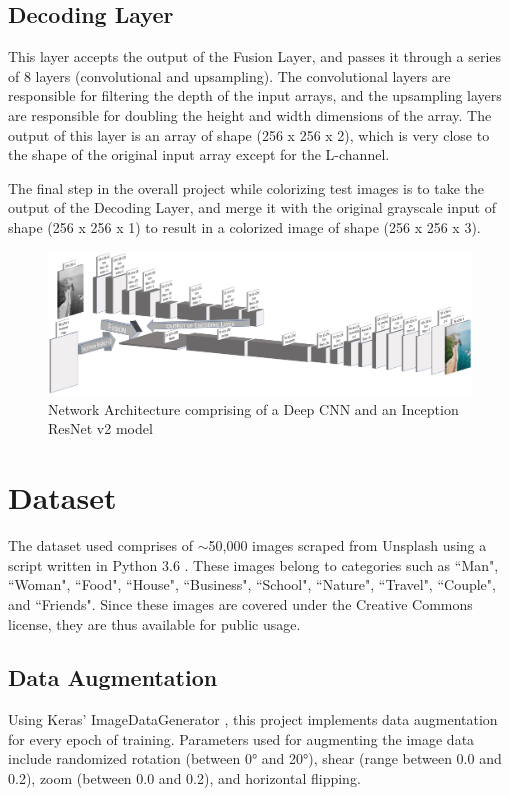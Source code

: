 \documentclass[10pt,twocolumn,letterpaper]{article}
\begin{document}
	\subsection{Decoding Layer}
	This layer accepts the output of the Fusion Layer, and passes it through a series of 8 layers (convolutional and upsampling). The convolutional layers are responsible for filtering the depth of the input arrays, and the upsampling layers are responsible for doubling the height and width dimensions of the array. The output of this layer is an array of shape (256 x 256 x 2), which is very close to the shape of the original input array except for the L-channel.

	The final step in the overall project while colorizing test images is to take the output of the Decoding Layer, and merge it with the original grayscale input of shape (256 x 256 x 1) to result in a colorized image of shape (256 x 256 x 3).

	\begin{figure}
		\includegraphics[width=\textwidth]{Architecture}
		\caption{Network Architecture comprising of a Deep CNN and an Inception ResNet v2 model}
		\centering
	\end{figure}

	\section{Dataset}
	The dataset used comprises of $\sim$50,000 images scraped from Unsplash \cite{Unsplash} using a script written in Python 3.6 \cite{Python}. These images belong to categories such as ``Man", ``Woman", ``Food", ``House", ``Business", ``School", ``Nature", ``Travel", ``Couple", and ``Friends". Since these images are covered under the Creative Commons license, they are thus available for public usage.

	\subsection{Data Augmentation}
	Using Keras' ImageDataGenerator \cite{Keras}, this project implements data augmentation for every epoch of training. Parameters used for augmenting the image data include randomized rotation (between 0° and 20°), shear (range between 0.0 and 0.2), zoom (between 0.0 and 0.2), and horizontal flipping.
\end{document}
